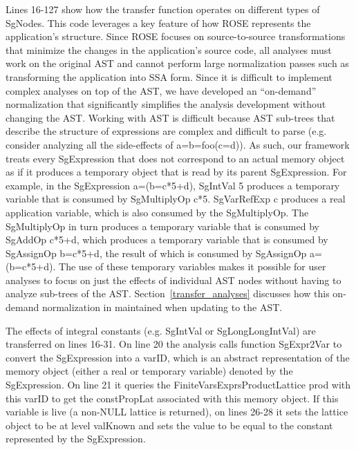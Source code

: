{Lines 16-127 show how the transfer function operates on different types of {\scriptsize SgNodes}. This code leverages a key feature of how ROSE represents the application’s structure. Since ROSE focuses on source-to-source transformations that minimize the changes in the application’s source code, all analyses must work on the original AST and cannot perform large normalization passes such as transforming the application into SSA form. Since it is difficult to implement complex analyses on top of the AST, we have developed an ``on-demand'' normalization that significantly simplifies the analysis development without changing the AST. Working with AST is difficult because AST sub-trees that describe the structure of expressions are complex and difficult to parse (e.g. consider analyzing all the side-effects of a=b=foo(c=d)). As such, our framework treats every SgExpression that does not correspond to an actual memory object as if it produces a temporary object that is read by its parent {\scriptsize SgExpression}. For example, in the {\scriptsize SgExpression} a=(b=c*5+d), {\scriptsize SgIntVal} 5 produces a temporary variable that is consumed by {\scriptsize SgMultiplyOp c*5. SgVarRefExp c} produces a real application variable, which is also consumed by the {\scriptsize SgMultiplyOp}. The SgMultiplyOp in turn produces a temporary variable that is consumed by {\scriptsize SgAddOp c*5+d}, which produces a temporary variable that is consumed by {\scriptsize SgAssignOp b=c*5+d}, the result of which is consumed by {\scriptsize SgAssignOp a=(b=c*5+d)}. The use of these temporary variables makes it possible for user analyses to focus on just the effects of individual AST nodes without having to analyze sub-trees of the AST. Section~\ref{transfer_analyses} discusses how this on-demand normalization in maintained when updating to the AST. 

The effects of integral constants (e.g. {\scriptsize SgIntVal} or {\scriptsize SgLongLongIntVal}) are transferred on lines 16-31. On line 20 the analysis calls function SgExpr2Var to convert the {\scriptsize SgExpression} into a {\scriptsize varID}, which is an abstract representation of the memory object (either a real or temporary variable) denoted by the {\scriptsize SgExpression}. On line 21 it queries the {\scriptsize FiniteVarsExprsProductLattice} prod with this {\scriptsize varID} to get the {\scriptsize constPropLat} associated with this memory object. If this variable is live (a non-NULL lattice is returned), on lines 26-28 it sets the lattice object to be at level {\scriptsize valKnown} and sets the value to be equal to the constant represented by the {\scriptsize SgExpression}.

}
